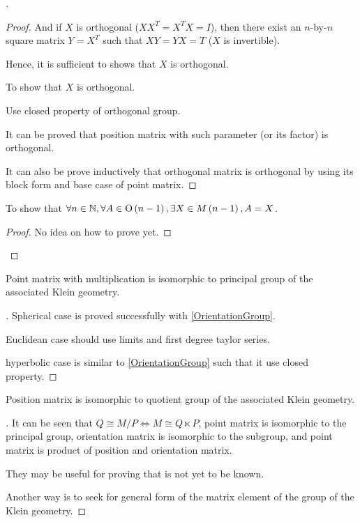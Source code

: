 \documentclass[stu, babel, american, biblatex, a4paper, draftall]{apa7}
\begin{document}
\begin{proof}[]
\begin{proof}
        And if $X$ is orthogonal ($X X^T = X^T X = I$),
        then there exist an $n$-by-$n$ square matrix $Y = X^T$ such that $X Y = Y X = T$ ($X$ is invertible).

        Hence, it is sufficient to shows that $X$ is orthogonal.

        To show that $X$ is orthogonal.

        \skipped

        Use closed property of orthogonal group.

        It can be proved that position matrix with such parameter (or its factor) is orthogonal.

        It can also be prove inductively that orthogonal matrix is orthogonal by using its block form and base case of point matrix.
    \end{proof}
    To show that $\forall n\in\mathbb{N}, \forall A\in \operatorname{O}\left(n-1\right), \exists X\in M\left(n-1\right), A=X$.
    \begin{proof}
        \skipped

        No idea on how to prove yet.
    \end{proof}
\end{proof}
\begin{lemma}\label{PointGroup}
    Point matrix with multiplication
    is isomorphic to principal group of the associated Klein geometry.
\end{lemma}
\begin{proof}[]
    \skipped

    Spherical case is proved successfully with \cref{OrientationGroup}.

    Euclidean case should use limits and first degree taylor series.

    hyperbolic case is similar to \cref{OrientationGroup} such that it use closed property.
\end{proof}
\begin{lemma}\label{PositionGroup}
    Position matrix is isomorphic to quotient group of the associated Klein geometry.
\end{lemma}
\begin{proof}[]
    \skipped

    It can be seen that $Q\cong M/P \iff M \cong Q \ltimes P$,
    point matrix is isomorphic to the principal group,
    orientation matrix is isomorphic to the subgroup,
    and point matrix is product of position and orientation matrix.

    They may be useful for proving that is not yet to be known.

    Another way is to seek for general form of the matrix element of the group of the Klein geometry.
\end{proof}
\end{document}
